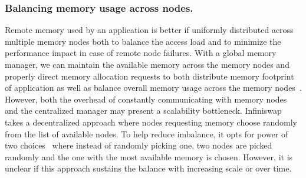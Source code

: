 \subsubsection{Balancing memory usage across nodes.}
Remote memory used by an application is better if uniformly 
distributed across multiple memory nodes both to balance the 
access load and to minimize the performance impact in case of 
remote node failures. With a global memory manager, we can maintain 
the available memory across the memory nodes and properly direct 
memory allocation requests to both distribute memory footprint 
of application as well as balance overall memory usage across 
the memory nodes~\cite{legoos,remregions,kona}. However, both 
the overhead of constantly communicating with memory nodes 
and the centralized manager may present a scalability bottleneck.
Infiniswap~\cite{infiniswap} takes a decentralized approach 
where nodes requesting memory choose randomly from the list of 
available nodes. To help reduce imbalance, it opts for power of 
two choices~\cite{10.5555/924815} where instead of randomly 
picking one, two nodes are picked randomly and the one with the 
most available memory is chosen. However, it is unclear if this 
approach sustains the balance with increasing scale or over time.

% 



